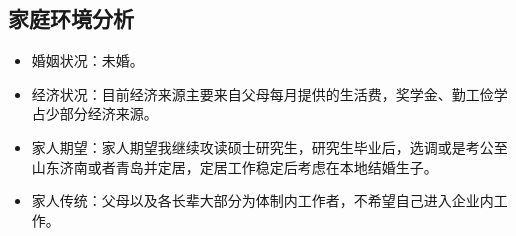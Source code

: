 \documentclass{article}
\begin{document}
\subsection{家庭环境分析}
\begin{itemize}
	
\item 婚姻状况：未婚。\par
\item 经济状况：目前经济来源主要来自父母每月提供的生活费，奖学金、勤工俭学占少部分经济来源。\par
\item 家人期望：家人期望我继续攻读硕士研究生，研究生毕业后，选调或是考公至山东济南或者青岛并定居，定居工作稳定后考虑在本地结婚生子。\par
\item 家人传统：父母以及各长辈大部分为体制内工作者，不希望自己进入企业内工作。
 
\end{itemize}
\end{document}
